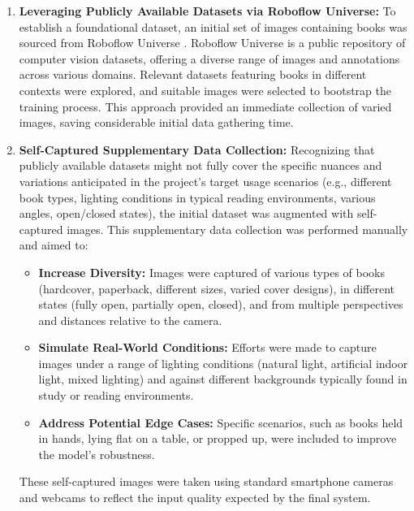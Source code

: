 \begin{enumerate}
    \item \textbf{Leveraging Publicly Available Datasets via Roboflow Universe:}
    To establish a foundational dataset, an initial set of images containing books was sourced from Roboflow Universe \cite{Roboflow2024}. Roboflow Universe is a public repository of computer vision datasets, offering a diverse range of images and annotations across various domains. Relevant datasets featuring books in different contexts were explored, and suitable images were selected to bootstrap the training process. This approach provided an immediate collection of varied images, saving considerable initial data gathering time.

    \item \textbf{Self-Captured Supplementary Data Collection:}
    Recognizing that publicly available datasets might not fully cover the specific nuances and variations anticipated in the project's target usage scenarios (e.g., different book types, lighting conditions in typical reading environments, various angles, open/closed states), the initial dataset was augmented with self-captured images. This supplementary data collection was performed manually and aimed to:
    \begin{itemize}
        \item \textbf{Increase Diversity:} Images were captured of various types of books (hardcover, paperback, different sizes, varied cover designs), in different states (fully open, partially open, closed), and from multiple perspectives and distances relative to the camera.
        \item \textbf{Simulate Real-World Conditions:} Efforts were made to capture images under a range of lighting conditions (natural light, artificial indoor light, mixed lighting) and against different backgrounds typically found in study or reading environments.
        \item \textbf{Address Potential Edge Cases:} Specific scenarios, such as books held in hands, lying flat on a table, or propped up, were included to improve the model's robustness.
    \end{itemize}
    These self-captured images were taken using standard smartphone cameras and webcams to reflect the input quality expected by the final system.
\end{enumerate}

